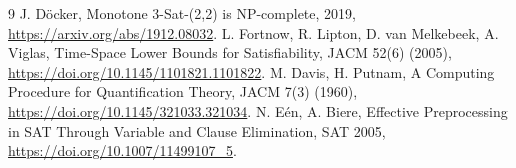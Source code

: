 \documentclass[10pt]{article}
\begin{document}
\begin{thebibliography}{9}
 J. D\"ocker, Monotone 3-Sat-(2,2) is NP-complete, 2019, \url{https://arxiv.org/abs/1912.08032}.
 L. Fortnow, R. Lipton, D. van Melkebeek, A. Viglas, Time-Space Lower Bounds for Satisfiability, JACM 52(6) (2005), \url{https://doi.org/10.1145/1101821.1101822}.
 M. Davis, H. Putnam, A Computing Procedure for Quantification Theory, JACM 7(3) (1960), \url{https://doi.org/10.1145/321033.321034}.
 N. E\'en, A. Biere, Effective Preprocessing in SAT Through Variable and Clause Elimination, SAT 2005, \url{https://doi.org/10.1007/11499107_5}.
\end{thebibliography}
\end{document}
